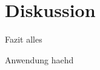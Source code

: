 \section{Diskussion}
\begin{frame}{Fazit}
alles
\end{frame}

\begin{frame}{Anwendung}
haehd
\end{frame}